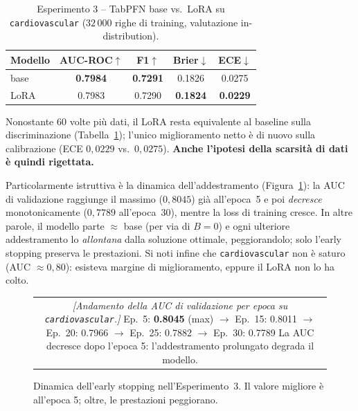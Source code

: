 \documentclass[11pt,a4paper]{article}
\begin{document}
\begin{table}[h]
\centering
\caption{Esperimento 3 -- TabPFN base vs.\ LoRA su \texttt{cardiovascular}
($32\,000$ righe di training, valutazione in-distribution).}
\label{tab:datasize}
\small
\begin{tabular}{lcccc}
\toprule
Modello & AUC-ROC$\uparrow$ & F1$\uparrow$ & Brier$\downarrow$ & ECE$\downarrow$ \\
\midrule
base & \textbf{0.7984} & \textbf{0.7291} & 0.1826 & 0.0275 \\
LoRA & 0.7983 & 0.7290 & \textbf{0.1824} & \textbf{0.0229} \\
\bottomrule
\end{tabular}
\end{table}

Nonostante $60$ volte più dati, il LoRA resta equivalente al baseline sulla
discriminazione (Tabella~\ref{tab:datasize}); l'unico miglioramento netto è di
nuovo sulla calibrazione (ECE $0{,}0229$ vs.\ $0{,}0275$). \textbf{Anche
l'ipotesi della scarsità di dati è quindi rigettata.}

Particolarmente istruttiva è la dinamica dell'addestramento
(Figura~\ref{fig:valauc}): la AUC di validazione raggiunge il massimo
($0{,}8045$) già all'epoca~5 e poi \emph{decresce} monotonicamente
($0{,}7789$ all'epoca~30), mentre la loss di training cresce. In altre parole, il
modello parte $\approx$ base (per via di $B=0$) e ogni ulteriore addestramento lo
\emph{allontana} dalla soluzione ottimale, peggiorandolo; solo l'early stopping
preserva le prestazioni. Si noti infine che \texttt{cardiovascular} non è saturo
(AUC $\approx 0{,}80$): esisteva margine di miglioramento, eppure il LoRA non lo
ha colto.

\begin{figure}[h]
\centering
\begin{tabular}{c}
\fbox{\parbox{0.85\textwidth}{\centering\footnotesize
\textit{[Andamento della AUC di validazione per epoca su
\texttt{cardiovascular}.]}\\[2pt]
Ep.\ 5: \textbf{0.8045} (max) \;$\to$\; Ep.\ 15: 0.8011 \;$\to$\;
Ep.\ 20: 0.7966 \;$\to$\; Ep.\ 25: 0.7882 \;$\to$\; Ep.\ 30: 0.7789\\[2pt]
La AUC decresce dopo l'epoca 5: l'addestramento prolungato degrada il modello.}}
\end{tabular}
\caption{Dinamica dell'early stopping nell'Esperimento~3. Il valore migliore è
all'epoca 5; oltre, le prestazioni peggiorano.}
\label{fig:valauc}
\end{figure}
\end{document}
